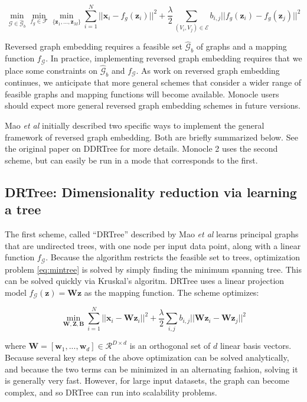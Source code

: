 \documentclass[10pt,oneside]{article}\usepackage[]{graphicx}\usepackage[]{color}
\begin{document}
\begin{equation}
\mathop{min}_{\mathcal{G} \in \hat{\mathcal{G}}_b}\mathop{min}_{f_g \in \mathcal{F}} \mathop{min}_{\{\mathbf{z}_1, ...,
\mathbf{z}_M\}} \sum_{i = 1}^N ||\mathbf{x}_i - f_g (\mathbf{z}_i)||^2 + \frac{\lambda}{2} \sum_{(V_i, V_j) \in \mathcal{E}}
b_{i,j}||f_g(\mathbf{z}_i) - f_g(\mathbf{z}_j)||^2
\end{equation}

Reversed graph embedding requires a feasible set $\hat{\mathcal{G}}_b$ of graphs and a 
mapping function $f_\mathcal{G}$. In practice, implementing reversed graph embedding
requires that we place some constraints on $\hat{\mathcal{G}}_b$ and $f_\mathcal{G}$.
As work on reversed graph embedding continues, we anticipate that more general 
schemes that consider a wider range of feasible graphs and mapping functions will
become available. Monocle users should expect more general reversed graph embedding
schemes in future versions.

Mao \emph{et al} initially described two specific ways to implement the general framework
of reversed graph embedding. Both are briefly summarized below. See the original
paper on DDRTree for more details. Monocle 2 uses the second scheme, but can easily be
run in a mode that corresponds to the first.

\subsection{DRTree: Dimensionality reduction via learning a tree}

The first scheme, called ``DRTree'' described by Mao \emph{et al} learns principal graphs that are
undirected trees, with one node per input data point, along with a linear function
$f_\mathcal{G}$. Because the algorithm restricts the feasible set to trees, 
optimization problem \ref{eq:mintree} is solved by simply finding the minimum spanning tree.
This can be solved quickly via Kruskal's algoritm. DRTree uses a 
linear projection model $f_\mathcal{G} (\mathbf{z}) = \mathbf{Wz}$ as 
the mapping function. The scheme optimizes:

\begin{equation}
\mathop{min}_{\mathbf{W}, \mathbf{Z}, \mathbf{B}} \sum_{i = 1}^N ||\mathbf{x}_i  - \mathbf{W}\mathbf{z}_i||^2 + \frac{\lambda}{2} \sum_{i,j}b_{i,j}||\mathbf{W} \mathbf{z}_i - \mathbf{W} \mathbf{z}_j||^2
\end{equation}

where $\mathbf{W} = [\mathbf{w}_1, ..., \mathbf{w}_d] \in
\mathcal{R}^{D \times d}$ is an orthogonal set of $d$ linear basis vectors.
Because several key steps of the above optimization can be solved analytically,
and because the two terms can be minimized in an alternating fashion, 
solving it is generally very fast. However, for large input datasets, the graph
can become complex, and so DRTree can run into scalability problems.
\end{document}
